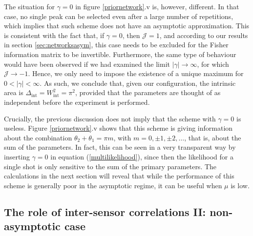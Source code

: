 The situation for $\gamma = 0$ in figure \ref{priornetwork}.v is, however, different. In that case, no single peak can be selected even after a large number of repetitions, which implies that such scheme does not have an asymptotic approximation. This is consistent with the fact that, if $\gamma = 0$, then $\mathcal{J} = 1$, and according to our results in section \ref{sec:networksasym}, this case needs to be excluded for the Fisher information matrix to be invertible. Furthermore, the same type of behaviour would have been observed if we had examined the limit $|\gamma| \rightarrow \infty$, for which $\mathcal{J}\rightarrow -1$. Hence, we only need to impose the existence of a unique maximum for $0 < |\gamma| < \infty$. As such, we conclude that, given our configuration, the intrinsic area is $\Delta_\mathrm{int} = W_\mathrm{int}^2 = \pi^2$, provided that the parameters are thought of as independent before the experiment is performed.

Crucially, the previous discussion does not imply that the scheme with $\gamma = 0$ is useless. Figure \ref{priornetwork}.v shows   that this scheme is giving information about the combination $\theta_2 + \theta_1 = \pi m$, with $m = 0, \pm 1, \pm 2, \dots$, that is, about the sum of the parameters. In fact, this can be seen in a very transparent way by inserting $\gamma = 0$ in equation (\ref{multilikelihood}), since then the likelihood for a single shot is only sensitive to the sum of the primary parameters. The calculations in the next section will reveal that while the performance of this scheme is generally poor in the asymptotic regime, it can be useful when $\mu$ is low.

\subsection{The role of inter-sensor correlations II: non-asymptotic case}
\label{subsec:correlationsmultibayes}

